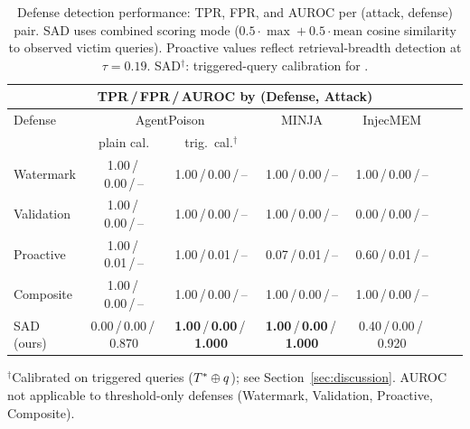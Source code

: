 \begin{table}[t]
\centering
\caption{Defense detection performance: TPR, FPR, and AUROC per (attack, defense) pair.
         SAD uses combined scoring mode ($0.5\cdot\max + 0.5\cdot\text{mean}$ cosine similarity to observed victim queries).
         Proactive values reflect retrieval-breadth detection at $\tau=0.19$.
         SAD$^\dagger$: triggered-query calibration for \agentpoison{}.}
\label{tab:defense_tpr_fpr}
\begin{tabular}{lcccccc}
\toprule
\multicolumn{7}{c}{TPR\,/\,FPR\,/\,AUROC by (Defense, Attack)} \\
\midrule
Defense & \multicolumn{2}{c}{AgentPoison} & MINJA & InjecMEM \\
        & plain cal.     & trig.\ cal.$^\dagger$ &       &          \\
\midrule
Watermark  & 1.00\,/\,0.00\,/\,--  & 1.00\,/\,0.00\,/\,--  & 1.00\,/\,0.00\,/\,-- & 1.00\,/\,0.00\,/\,-- \\
Validation & 1.00\,/\,0.00\,/\,--  & 1.00\,/\,0.00\,/\,--  & 1.00\,/\,0.00\,/\,-- & 0.00\,/\,0.00\,/\,-- \\
Proactive  & 1.00\,/\,0.01\,/\,--  & 1.00\,/\,0.01\,/\,--  & 0.07\,/\,0.01\,/\,-- & 0.60\,/\,0.01\,/\,-- \\
Composite  & 1.00\,/\,0.00\,/\,--  & 1.00\,/\,0.00\,/\,--  & 1.00\,/\,0.00\,/\,-- & 1.00\,/\,0.00\,/\,-- \\
SAD (ours) & 0.00\,/\,0.00\,/\,0.870 & \textbf{1.00}\,/\,\textbf{0.00}\,/\,\textbf{1.000} & \textbf{1.00}\,/\,\textbf{0.00}\,/\,\textbf{1.000} & 0.40\,/\,0.00\,/\,0.920 \\
\bottomrule
\end{tabular}
\vspace{0.5ex}
{\small $^\dagger$Calibrated on triggered queries ($T^*\oplus q$); see Section~\ref{sec:discussion}.
AUROC not applicable to threshold-only defenses (Watermark, Validation, Proactive, Composite).}
\end{table}
